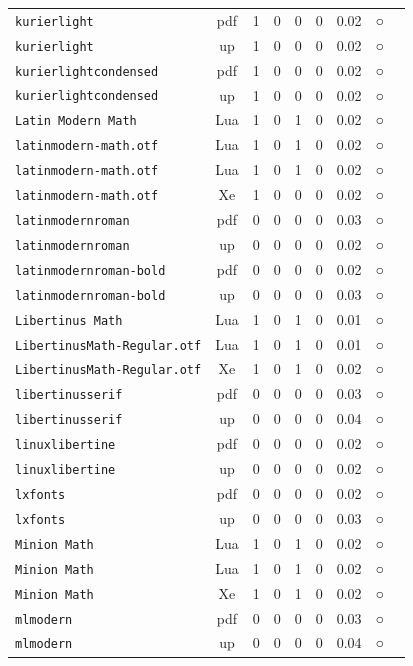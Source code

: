 \begin{longtable}{@{}lcrrrrrcl@{}}
\texttt{kurierlight} & pdf & 1 & 0 & 0 & 0 & 0.02 & ○ & \\
\texttt{kurierlight} & up & 1 & 0 & 0 & 0 & 0.02 & ○ & \\
\texttt{kurierlightcondensed} & pdf & 1 & 0 & 0 & 0 & 0.02 & ○ & \\
\texttt{kurierlightcondensed} & up & 1 & 0 & 0 & 0 & 0.02 & ○ & \\
\texttt{Latin Modern Math} & Lua & 1 & 0 & 1 & 0 & 0.02 & ○ & \\
\texttt{latinmodern-math.otf} & Lua & 1 & 0 & 1 & 0 & 0.02 & ○ & \\
\texttt{latinmodern-math.otf} & Lua & 1 & 0 & 1 & 0 & 0.02 & ○ & \\
\texttt{latinmodern-math.otf} & Xe & 1 & 0 & 0 & 0 & 0.02 & ○ & \\
\texttt{latinmodernroman} & pdf & 0 & 0 & 0 & 0 & 0.03 & ○ & \\
\texttt{latinmodernroman} & up & 0 & 0 & 0 & 0 & 0.02 & ○ & \\
\texttt{latinmodernroman-bold} & pdf & 0 & 0 & 0 & 0 & 0.02 & ○ & \\
\texttt{latinmodernroman-bold} & up & 0 & 0 & 0 & 0 & 0.03 & ○ & \\
\texttt{Libertinus Math} & Lua & 1 & 0 & 1 & 0 & 0.01 & ○ & \\
\texttt{LibertinusMath-Regular.otf} & Lua & 1 & 0 & 1 & 0 & 0.01 & ○ & \\
\texttt{LibertinusMath-Regular.otf} & Xe & 1 & 0 & 1 & 0 & 0.02 & ○ & \\
\texttt{libertinusserif} & pdf & 0 & 0 & 0 & 0 & 0.03 & ○ & \\
\texttt{libertinusserif} & up & 0 & 0 & 0 & 0 & 0.04 & ○ & \\
\texttt{linuxlibertine} & pdf & 0 & 0 & 0 & 0 & 0.02 & ○ & \\
\texttt{linuxlibertine} & up & 0 & 0 & 0 & 0 & 0.02 & ○ & \\
\texttt{lxfonts} & pdf & 0 & 0 & 0 & 0 & 0.02 & ○ & \\
\texttt{lxfonts} & up & 0 & 0 & 0 & 0 & 0.03 & ○ & \\
\texttt{Minion Math} & Lua & 1 & 0 & 1 & 0 & 0.02 & ○ & \\
\texttt{Minion Math} & Lua & 1 & 0 & 1 & 0 & 0.02 & ○ & \\
\texttt{Minion Math} & Xe & 1 & 0 & 1 & 0 & 0.02 & ○ & \\
\texttt{mlmodern} & pdf & 0 & 0 & 0 & 0 & 0.03 & ○ & \\
\texttt{mlmodern} & up & 0 & 0 & 0 & 0 & 0.04 & ○ & \\

\end{longtable}
